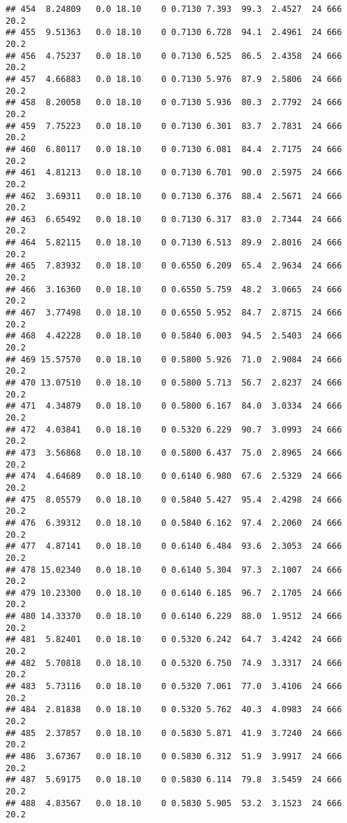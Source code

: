 \documentclass[]{article}
\begin{document}
\begin{verbatim}
## 454  8.24809   0.0 18.10    0 0.7130 7.393  99.3  2.4527  24 666    20.2
## 455  9.51363   0.0 18.10    0 0.7130 6.728  94.1  2.4961  24 666    20.2
## 456  4.75237   0.0 18.10    0 0.7130 6.525  86.5  2.4358  24 666    20.2
## 457  4.66883   0.0 18.10    0 0.7130 5.976  87.9  2.5806  24 666    20.2
## 458  8.20058   0.0 18.10    0 0.7130 5.936  80.3  2.7792  24 666    20.2
## 459  7.75223   0.0 18.10    0 0.7130 6.301  83.7  2.7831  24 666    20.2
## 460  6.80117   0.0 18.10    0 0.7130 6.081  84.4  2.7175  24 666    20.2
## 461  4.81213   0.0 18.10    0 0.7130 6.701  90.0  2.5975  24 666    20.2
## 462  3.69311   0.0 18.10    0 0.7130 6.376  88.4  2.5671  24 666    20.2
## 463  6.65492   0.0 18.10    0 0.7130 6.317  83.0  2.7344  24 666    20.2
## 464  5.82115   0.0 18.10    0 0.7130 6.513  89.9  2.8016  24 666    20.2
## 465  7.83932   0.0 18.10    0 0.6550 6.209  65.4  2.9634  24 666    20.2
## 466  3.16360   0.0 18.10    0 0.6550 5.759  48.2  3.0665  24 666    20.2
## 467  3.77498   0.0 18.10    0 0.6550 5.952  84.7  2.8715  24 666    20.2
## 468  4.42228   0.0 18.10    0 0.5840 6.003  94.5  2.5403  24 666    20.2
## 469 15.57570   0.0 18.10    0 0.5800 5.926  71.0  2.9084  24 666    20.2
## 470 13.07510   0.0 18.10    0 0.5800 5.713  56.7  2.8237  24 666    20.2
## 471  4.34879   0.0 18.10    0 0.5800 6.167  84.0  3.0334  24 666    20.2
## 472  4.03841   0.0 18.10    0 0.5320 6.229  90.7  3.0993  24 666    20.2
## 473  3.56868   0.0 18.10    0 0.5800 6.437  75.0  2.8965  24 666    20.2
## 474  4.64689   0.0 18.10    0 0.6140 6.980  67.6  2.5329  24 666    20.2
## 475  8.05579   0.0 18.10    0 0.5840 5.427  95.4  2.4298  24 666    20.2
## 476  6.39312   0.0 18.10    0 0.5840 6.162  97.4  2.2060  24 666    20.2
## 477  4.87141   0.0 18.10    0 0.6140 6.484  93.6  2.3053  24 666    20.2
## 478 15.02340   0.0 18.10    0 0.6140 5.304  97.3  2.1007  24 666    20.2
## 479 10.23300   0.0 18.10    0 0.6140 6.185  96.7  2.1705  24 666    20.2
## 480 14.33370   0.0 18.10    0 0.6140 6.229  88.0  1.9512  24 666    20.2
## 481  5.82401   0.0 18.10    0 0.5320 6.242  64.7  3.4242  24 666    20.2
## 482  5.70818   0.0 18.10    0 0.5320 6.750  74.9  3.3317  24 666    20.2
## 483  5.73116   0.0 18.10    0 0.5320 7.061  77.0  3.4106  24 666    20.2
## 484  2.81838   0.0 18.10    0 0.5320 5.762  40.3  4.0983  24 666    20.2
## 485  2.37857   0.0 18.10    0 0.5830 5.871  41.9  3.7240  24 666    20.2
## 486  3.67367   0.0 18.10    0 0.5830 6.312  51.9  3.9917  24 666    20.2
## 487  5.69175   0.0 18.10    0 0.5830 6.114  79.8  3.5459  24 666    20.2
## 488  4.83567   0.0 18.10    0 0.5830 5.905  53.2  3.1523  24 666    20.2

\end{verbatim}
\end{document}

